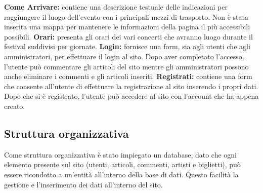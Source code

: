 \documentclass[10pt, a4paper]{article}
\begin{document}
\newline \textbf{Come Arrivare: }contiene una descrizione testuale delle indicazioni per raggiungere il luogo dell'evento con i principali mezzi di trasporto. Non è stata inserita una mappa per mantenere le informazioni della pagina il più accessibili possibili.
\newline \textbf{Orari: }presenta gli orari dei vari concerti che avranno luogo durante il festival suddivisi per giornate.
\newline \textbf{Login: }fornisce una form, sia agli utenti che agli amministratori, per effettuare il login al sito. Dopo aver completato l'accesso, l'utente può commentare gli articoli del sito mentre gli amministratori possono anche eliminare i commenti e gli articoli inseriti.
\newline \textbf{Registrati: }contiene una form che consente all'utente di effettuare la registrazione al sito inserendo i propri dati. Dopo che si è registrato, l'utente può accedere al sito con l'account che ha appena creato.
\subsection{Struttura organizzativa}
Come struttura organizzativa è stato impiegato un database, dato che ogni elemento presente sul sito (utenti, articoli, commenti, artisti e biglietti), può essere ricondotto a un'entità all'interno della base di dati. Questo facilità la gestione e l'inserimento dei dati all'interno del sito.
\end{document}
